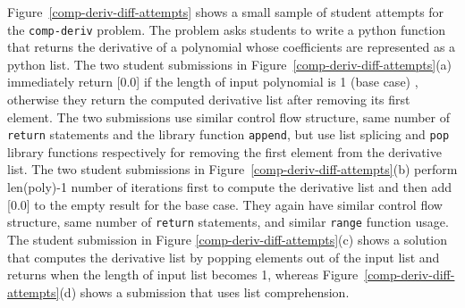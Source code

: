 \documentclass[12pt]{article}
\newcommand\codevar[1]{\texttt{#1}}
\begin{document}
Figure~\ref{comp-deriv-diff-attempts} shows a small sample of student attempts for the \codevar{comp-deriv} problem. The problem asks students to write a python function that returns the derivative of a polynomial whose coefficients are represented as a python list. The two student submissions in Figure~\ref{comp-deriv-diff-attempts}(a) immediately return [0.0] if the length of input polynomial is 1 (base case) , otherwise they return the computed derivative list after removing its first element. The two submissions use similar control flow structure, same number of \codevar{return} statements and the library function \codevar{append}, but use list splicing and \codevar{pop} library functions respectively for removing the first element from the derivative list. The two student submissions in Figure~\ref{comp-deriv-diff-attempts}(b) perform len(poly)-1 number of iterations first to compute the derivative list and then add [0.0] to the empty result for the base case. They again have similar control flow structure, same number of \codevar{return} statements, and similar \codevar{range} function usage. The student submission in Figure \ref{comp-deriv-diff-attempts}(c) shows a solution that computes the derivative list by popping elements out of the input list and returns when the length of input list becomes 1, whereas Figure~\ref{comp-deriv-diff-attempts}(d) shows a submission that uses list comprehension.
\end{document}
